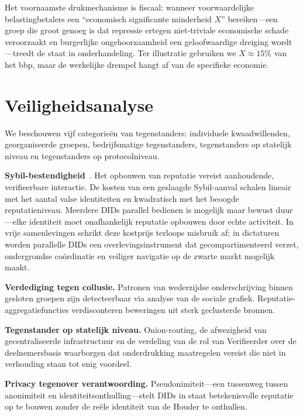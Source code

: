 \documentclass[11pt,a4paper,twocolumn]{article}
\begin{document}
Het voornaamste drukmechanisme is fiscaal: wanneer voorwaardelijke belastingbetalers een ``economisch significante minderheid $X$'' bereiken---een groep die groot genoeg is dat repressie ertegen niet-triviale economische schade veroorzaakt en burgerlijke ongehoorzaamheid een geloofwaardige dreiging wordt---treedt de staat in onderhandeling. Ter illustratie gebruiken we $X \approx 15\%$ van het bbp, maar de werkelijke drempel hangt af van de specifieke economie.

\section{Veiligheidsanalyse}

We beschouwen vijf categorieën van tegenstanders: individuele kwaadwillenden, georganiseerde groepen, bedrijfsmatige tegenstanders, tegenstanders op statelijk niveau en tegenstanders op protocolniveau.

\textbf{Sybil-bestendigheid}~\cite{douceur2002}. Het opbouwen van reputatie vereist aanhoudende, verifieerbare interactie. De kosten van een geslaagde Sybil-aanval schalen lineair met het aantal valse identiteiten en kwadratisch met het beoogde reputatieniveau. Meerdere DIDs parallel bedienen is mogelijk maar bewust duur---elke identiteit moet onafhankelijk reputatie opbouwen door echte activiteit. In vrije samenlevingen schrikt deze kostprijs terloops misbruik af; in dictaturen worden parallelle DIDs een overlevingsinstrument dat gecompartimenteerd verzet, ondergrondse coördinatie en veiliger navigatie op de zwarte markt mogelijk maakt.

\textbf{Verdediging tegen collusie.} Patronen van wederzijdse onderschrijving binnen gesloten groepen zijn detecteerbaar via analyse van de sociale grafiek. Reputatie-aggregatiefuncties verdisconteren beweringen uit sterk geclusterde bronnen.

\textbf{Tegenstander op statelijk niveau.} Onion-routing, de afwezigheid van gecentraliseerde infrastructuur en de verdeling van de rol van Verifieerder over de deelnemersbasis waarborgen dat onderdrukking maatregelen vereist die niet in verhouding staan tot enig voordeel.

\textbf{Privacy tegenover verantwoording.} Pseudonimiteit---een tussenweg tussen anonimiteit en identiteitsonthulling---stelt DIDs in staat betekenisvolle reputatie op te bouwen zonder de reële identiteit van de Houder te onthullen.
\end{document}
